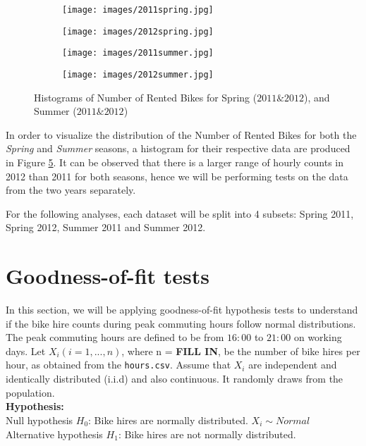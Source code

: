 \begin{figure}[h]

\begin{subfigure}{0.225\textwidth}
\texttt{[image: images/2011spring.jpg]} 

\label{fig:subim2.1}
\end{subfigure}
\begin{subfigure}{0.225\textwidth}
\texttt{[image: images/2012spring.jpg]}

\label{fig:subim2.2}
\end{subfigure}
\begin{subfigure}{0.225\textwidth}
\texttt{[image: images/2011summer.jpg]} 

\label{fig:subim2.3}
\end{subfigure}
\begin{subfigure}{0.225\textwidth}
\texttt{[image: images/2012summer.jpg]}

\label{fig:subim2.4}
\end{subfigure}
\caption{Histograms of Number of Rented Bikes for Spring ($2011 \& 2012$), and Summer ($2011 \& 2012$)}
\label{fig:image2}
\end{figure}

In order to visualize the distribution of the Number of Rented Bikes for both the \textit{Spring} and \textit{Summer} seasons, a histogram for their respective data are produced in Figure \ref{fig:image2}. It can be observed that there is a larger range of hourly counts in 2012 than 2011 for both seasons, hence we will be performing tests on the data from the two years separately.

For the following analyses, each dataset will be split into 4 subsets: Spring 2011, Spring 2012, Summer 2011 and Summer 2012.

\section{Goodness-of-fit tests}
In this section, we will be applying goodness-of-fit hypothesis tests to understand if the bike hire counts during peak commuting hours follow normal distributions. The peak commuting hours are defined to be from $16:00$ to $21:00$ on working days. Let $X_i(i=1,...,n)$, where n = \textbf{FILL IN}, be the number of bike hires per hour, as obtained from the \texttt{hours.csv}. Assume that $X_i$ are independent and identically distributed (i.i.d) and also continuous. It randomly draws from the population. \\
\textbf{Hypothesis:} \\
Null hypothesis $H_0$: Bike hires are normally distributed. $X_i\sim Normal$ \\
Alternative hypothesis $H_1$: Bike hires are not normally distributed.
